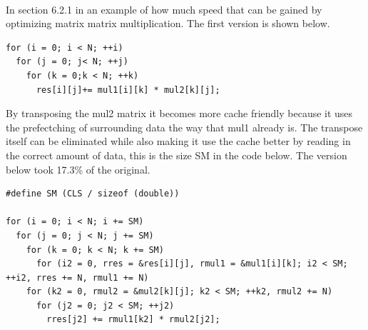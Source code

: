 \documentclass[10pt,a4paper]{report}
\begin{document}
\\
In section 6.2.1 in \cite{drepper2007cpumemory} an example of how much speed that can be gained by optimizing matrix matrix multiplication. The first version is shown below.

\begin{lstlisting}
for (i = 0; i < N; ++i)
  for (j = 0; j< N; ++j)
    for (k = 0;k < N; ++k)
      res[i][j]+= mul1[i][k] * mul2[k][j];
\end{lstlisting}

By transposing the mul2 matrix it becomes more cache friendly because it uses the prefectching of surrounding data the way that mul1 already is\cite{drepper2007cpumemory}. The transpose itself can be eliminated while also making it use the cache better by reading in the correct amount of data, this is the size SM in the code below\cite{drepper2007cpumemory}. 
The version below took 17.3\% of the original\cite{drepper2007cpumemory}.

\begin{lstlisting}
#define SM (CLS / sizeof (double))

for (i = 0; i < N; i += SM)
  for (j = 0; j < N; j += SM)
    for (k = 0; k < N; k += SM)
      for (i2 = 0, rres = &res[i][j], rmul1 = &mul1[i][k]; i2 < SM; ++i2, rres += N, rmul1 += N)
	for (k2 = 0, rmul2 = &mul2[k][j]; k2 < SM; ++k2, rmul2 += N)
	  for (j2 = 0; j2 < SM; ++j2)
	    rres[j2] += rmul1[k2] * rmul2[j2];
\end{lstlisting}
\end{document}
